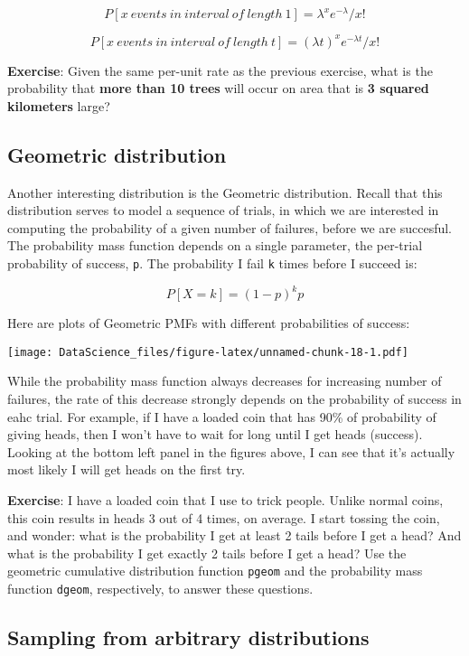 \documentclass[
]{book}
\begin{document}
\[P[ x\ events\ in\ interval\ of\ length\ 1] =  \lambda^x e^{-\lambda}/x!\]

\[P[ x\ events\ in\ interval\ of\ length\ t] =  (\lambda t)^x e^{-\lambda t}/x!\]

\textbf{Exercise}: Given the same per-unit rate as the previous exercise, what is the probability that \textbf{more than 10 trees} will occur on area that is \textbf{3 squared kilometers} large?

\hypertarget{geometric-distribution}{%
\subsection{Geometric distribution}\label{geometric-distribution}}

Another interesting distribution is the Geometric distribution. Recall that this distribution serves to model a sequence of trials, in which we are interested in computing the probability of a given number of failures, before we are succesful. The probability mass function depends on a single parameter, the per-trial probability of success, \texttt{p}. The probability I fail \texttt{k} times before I succeed is:

\[P[X = k] = (1-p)^k p \]

Here are plots of Geometric PMFs with different probabilities of success:

\texttt{[image: DataScience\_files/figure-latex/unnamed-chunk-18-1.pdf]}

While the probability mass function always decreases for increasing number of failures, the rate of this decrease strongly depends on the probability of success in eahc trial. For example, if I have a loaded coin that has 90\% of probability of giving heads, then I won't have to wait for long until I get heads (success). Looking at the bottom left panel in the figures above, I can see that it's actually most likely I will get heads on the first try.

\textbf{Exercise}: I have a loaded coin that I use to trick people. Unlike normal coins, this coin results in heads 3 out of 4 times, on average. I start tossing the coin, and wonder: what is the probability I get at least 2 tails before I get a head? And what is the probability I get exactly 2 tails before I get a head? Use the geometric cumulative distribution function \texttt{pgeom} and the probability mass function \texttt{dgeom}, respectively, to answer these questions.

\hypertarget{sampling-from-arbitrary-distributions}{%
\subsection{Sampling from arbitrary distributions}\label{sampling-from-arbitrary-distributions}}
\end{document}
